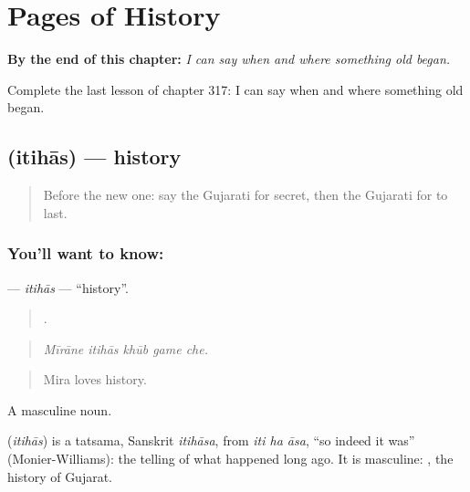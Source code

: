 
\chapter{Pages of History}
\label{ch:gu-pages-of-history}

\begin{chapteropening}
\textbf{By the end of this chapter:} \emph{I can say when and where something old began.}

Complete the last lesson of chapter 317: I can say when and where something old began.
\end{chapteropening}

\section[\texorpdfstring{\gu{ઇતિહાસ} (itihās)}{ઇતિહાસ (itihās)}]{ (itihās) — history}

\label{lesson:GU-C317-itihas}



\begin{quote}
Before the new one: say the Gujarati for secret, then the Gujarati for to last.
\end{quote}

\subsection*{You'll want to know: }
\textbf{} — \emph{itihās} — \textquotedblleft{}history\textquotedblright{}.

\begin{quote}
    .
\end{quote}

\begin{quote}
\emph{Mīrāne itihās khūb game che.}
\end{quote}

\begin{quote}
Mira loves history.
\end{quote}

A masculine noun.

\begin{cousinweb}
\textbf{} (\emph{itihās}) is a tatsama, Sanskrit \emph{itihāsa}, from \emph{iti ha āsa}, \textquotedblleft{}so indeed it was\textquotedblright{} (Monier-Williams): the telling of what happened long ago. It is masculine: \textbf{ }, the history of Gujarat.
\end{cousinweb}

